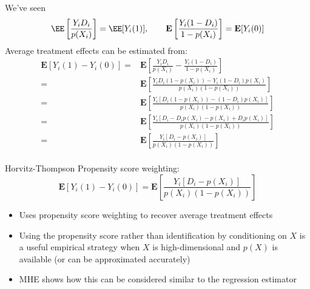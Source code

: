 \documentclass[compress, 8pt]{beamer}
\begin{document}
\begin{frame}{}

We've seen
\begin{equation*}
\EE \left[ \frac{Y_i D_i}{p(X_i)} \right] = \EE [Y_i(1)],
\quad \quad
    \mathbf{E} \left[ \frac{Y_i (1 - D_i)}{1 - p(X_i)} \right] = \mathbf{E} [Y_i(0)]
\end{equation*}
Average treatment effects can be estimated from:
\begin{align*}
\mathbf{E} [Y_i(1) - Y_i(0)]
=& \mathbf{E} 
\left[ 
    \frac{Y_i D_i}{p(X_i)}
    - \frac{Y_i (1 - D_i)}{1 - p(X_i)}
\right] \\
=& \mathbf{E} \left[ \frac{Y_i D_i (1 - p(X_i)) - Y_i (1 - D_i) p(X_i)}{p(X_i) (1 - p(X_i))} \right] \\
=& \mathbf{E} \left[ \frac{Y_i \left[ D_i (1 - p(X_i)) - (1 - D_i) p(X_i) \right]}{p(X_i) (1 - p(X_i))} \right] \\
=& \mathbf{E} \left[ \frac{Y_i \left[ D_i - D_i p(X_i) - p(X_i) +  D_i p(X_i) \right]}{p(X_i) (1 - p(X_i))} \right] \\
=& \mathbf{E} \left[ \frac{Y_i \left[ D_i - p(X_i) \right]}{p(X_i) (1 - p(X_i))} \right] \\
\end{align*}

\end{frame}

\begin{frame}{}

Horvitz-Thompson Propensity score weighting:
\begin{equation*}
    \mathbf{E} [Y_i(1) - Y_i(0)]
    = \mathbf{E} \left[ \frac{Y_i \left[ D_i - p(X_i) \right]}{p(X_i) (1 - p(X_i))} \right]
\end{equation*}
\begin{itemize}
    \item Uses propensity score weighting to recover average treatment effects
    \item Using the propensity score rather than identification by conditioning on $X$ is a useful empirical strategy when $X$ is high-dimensional and $p(X)$ is available (or can be approximated accurately)
    \item MHE shows how this can be considered similar to the regression estimator
\end{itemize}


\end{frame}
\end{document}
